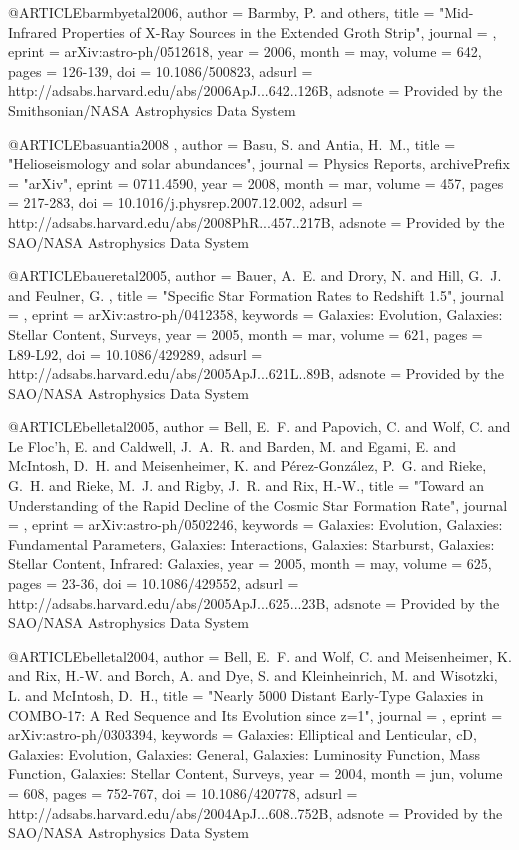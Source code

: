 {{{@ARTICLE{barmbyetal2006,
   author = {{Barmby}, P. and others},
    title = "{Mid-Infrared Properties of X-Ray Sources in the Extended Groth Strip}",
  journal = {\apj},
   eprint = {arXiv:astro-ph/0512618},
     year = 2006,
    month = may,
   volume = 642,
    pages = {126-139},
      doi = {10.1086/500823},
   adsurl = {http://adsabs.harvard.edu/abs/2006ApJ...642..126B},
  adsnote = {Provided by the Smithsonian/NASA Astrophysics Data System}
}

@ARTICLE{basuantia2008 ,
   author = {{Basu}, S. and {Antia}, H.~M.},
    title = "{Helioseismology and solar abundances}",
journal = {Physics Reports},
archivePrefix = "arXiv",
   eprint = {0711.4590},
     year = 2008,
    month = mar,
   volume = 457,
    pages = {217-283},
      doi = {10.1016/j.physrep.2007.12.002},
   adsurl = {http://adsabs.harvard.edu/abs/2008PhR...457..217B},
  adsnote = {Provided by the SAO/NASA Astrophysics Data System}
}


@ARTICLE{baueretal2005,
   author = {{Bauer}, A.~E. and {Drory}, N. and {Hill}, G.~J. and {Feulner}, G.
	},
    title = "{Specific Star Formation Rates to Redshift 1.5}",
  journal = {\apjl},
   eprint = {arXiv:astro-ph/0412358},
 keywords = {Galaxies: Evolution, Galaxies: Stellar Content, Surveys},
     year = 2005,
    month = mar,
   volume = 621,
    pages = {L89-L92},
      doi = {10.1086/429289},
   adsurl = {http://adsabs.harvard.edu/abs/2005ApJ...621L..89B},
  adsnote = {Provided by the SAO/NASA Astrophysics Data System}
}

@ARTICLE{belletal2005,
   author = {{Bell}, E.~F. and {Papovich}, C. and {Wolf}, C. and {Le Floc'h}, E. and 
	{Caldwell}, J.~A.~R. and {Barden}, M. and {Egami}, E. and {McIntosh}, D.~H. and 
	{Meisenheimer}, K. and {P{\'e}rez-Gonz{\'a}lez}, P.~G. and {Rieke}, G.~H. and 
	{Rieke}, M.~J. and {Rigby}, J.~R. and {Rix}, {H.-W.}},
    title = "{Toward an Understanding of the Rapid Decline of the Cosmic Star Formation Rate}",
  journal = {\apj},
   eprint = {arXiv:astro-ph/0502246},
 keywords = {Galaxies: Evolution, Galaxies: Fundamental Parameters, Galaxies: Interactions, Galaxies: Starburst, Galaxies: Stellar Content, Infrared: Galaxies},
     year = 2005,
    month = may,
   volume = 625,
    pages = {23-36},
      doi = {10.1086/429552},
   adsurl = {http://adsabs.harvard.edu/abs/2005ApJ...625...23B},
  adsnote = {Provided by the SAO/NASA Astrophysics Data System}
}


@ARTICLE{belletal2004,
   author = {{Bell}, E.~F. and {Wolf}, C. and {Meisenheimer}, K. and {Rix}, H.-W. and 
	{Borch}, A. and {Dye}, S. and {Kleinheinrich}, M. and {Wisotzki}, L. and 
	{McIntosh}, D.~H.},
    title = "{Nearly 5000 Distant Early-Type Galaxies in COMBO-17: A Red Sequence and Its Evolution since z=1}",
  journal = {\apj},
   eprint = {arXiv:astro-ph/0303394},
 keywords = {Galaxies: Elliptical and Lenticular, cD, Galaxies: Evolution, Galaxies: General, Galaxies: Luminosity Function, Mass Function, Galaxies: Stellar Content, Surveys},
     year = 2004,
    month = jun,
   volume = 608,
    pages = {752-767},
      doi = {10.1086/420778},
   adsurl = {http://adsabs.harvard.edu/abs/2004ApJ...608..752B},
  adsnote = {Provided by the SAO/NASA Astrophysics Data System}
}


}}}
